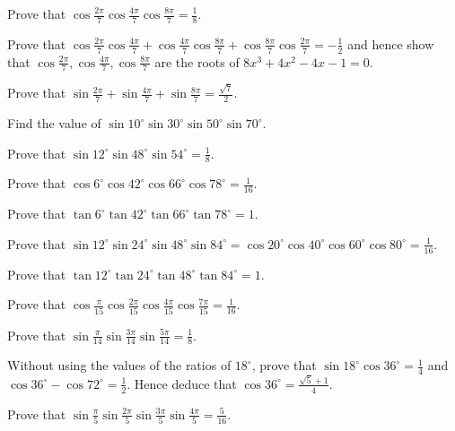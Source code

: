 \item Prove that $\cos\frac{2\pi}{7}\cos\frac{4\pi}{7}\cos\frac{8\pi}{7} = \frac{1}{8}$.

\item Prove that $\cos\frac{2\pi}{7}\cos\frac{4\pi}{7} + \cos\frac{4\pi}{7}\cos\frac{8\pi}{7} + \cos\frac{8\pi}{7}\cos\frac{2\pi}{7}
    = -\frac{1}{2}$ and hence show that $\cos\frac{2\pi}{7}, \cos\frac{4\pi}{7}, \cos\frac{8\pi}{7}$ are the roots of $8x^3 +
    4x^2 - 4x - 1 = 0$.

\item Prove that $\sin\frac{2\pi}{7} + \sin\frac{4\pi}{7} + \sin\frac{8\pi}{7} = \frac{\sqrt{7}}{2}$.

\item Find the value of $\sin 10^\circ\sin 30^\circ\sin 50^\circ\sin 70^\circ$.

\item Prove that $\sin 12^\circ\sin 48^\circ\sin 54^\circ = \frac{1}{8}$.

\item Prove that $\cos 6^\circ\cos 42^\circ\cos 66^\circ\cos 78^\circ = \frac{1}{16}$.

\item Prove that $\tan 6^\circ\tan 42^\circ\tan 66^\circ\tan 78^\circ = 1$.

\item Prove that $\sin 12^\circ\sin 24^\circ\sin 48^\circ\sin 84^\circ = \cos 20^\circ\cos 40^\circ\cos 60^\circ\cos 80^\circ =
    \frac{1}{16}$.

\item Prove that $\tan 12^\circ\tan 24^\circ\tan 48^\circ\tan 84^\circ = 1$.

\item Prove that $\cos\frac{\pi}{15}\cos\frac{2\pi}{15}\cos\frac{4\pi}{15}\cos\frac{7\pi}{15} = \frac{1}{16}$.

\item Prove that $\sin\frac{\pi}{14}\sin\frac{3\pi}{14}\sin\frac{5\pi}{14} = \frac{1}{8}$.

\item Without using the values of the ratios of $18^\circ$, prove that $\sin 18^\circ\cos 36^\circ = \frac{1}{4}$ and $\cos
    36^\circ - \cos 72^\circ = \frac{1}{2}$. Hence deduce that $\cos 36^\circ = \frac{\sqrt{5} + 1}{4}$.

\item Prove that $\sin\frac{\pi}{5}\sin\frac{2\pi}{5}\sin\frac{3\pi}{5}\sin\frac{4\pi}{5} = \frac{5}{16}$.

